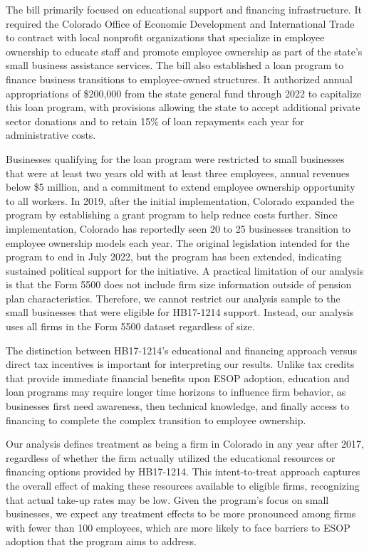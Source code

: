 \documentclass[12pt]{article}
\begin{document}
The bill primarily focused on educational support and financing infrastructure. It required the Colorado Office of Economic Development and International Trade to contract with local nonprofit organizations that specialize in employee ownership to educate staff and promote employee ownership as part of the state's small business assistance services. The bill also established a loan program to finance business transitions to employee-owned structures. It authorized annual appropriations of \$200,000 from the state general fund through 2022 to capitalize this loan program, with provisions allowing the state to accept additional private sector donations and to retain 15\% of loan repayments each year for administrative costs.

Businesses qualifying for the loan program were restricted to small businesses that were at least two years old with at least three employees, annual revenues below \$5 million, and a commitment to extend employee ownership opportunity to all workers. In 2019, after the initial implementation, Colorado expanded the program by establishing a grant program to help reduce costs further. Since implementation, Colorado has reportedly seen 20 to 25 businesses transition to employee ownership models each year. The original legislation intended for the program to end in July 2022, but the program has been extended, indicating sustained political support for the initiative. A practical limitation of our analysis is that the Form 5500 does not include firm size information outside of pension plan characteristics. Therefore, we cannot restrict our analysis sample to the small businesses that were eligible for HB17-1214 support. Instead, our analysis uses all firms in the Form 5500 dataset regardless of size. 

The distinction between HB17-1214's educational and financing approach versus direct tax incentives is important for interpreting our results. Unlike tax credits that provide immediate financial benefits upon ESOP adoption, education and loan programs may require longer time horizons to influence firm behavior, as businesses first need awareness, then technical knowledge, and finally access to financing to complete the complex transition to employee ownership.

Our analysis defines treatment as being a firm in Colorado in any year after 2017, regardless of whether the firm actually utilized the educational resources or financing options provided by HB17-1214. This intent-to-treat approach captures the overall effect of making these resources available to eligible firms, recognizing that actual take-up rates may be low. Given the program's focus on small businesses, we expect any treatment effects to be more pronounced among firms with fewer than 100 employees, which are more likely to face barriers to ESOP adoption that the program aims to address.
\end{document}
